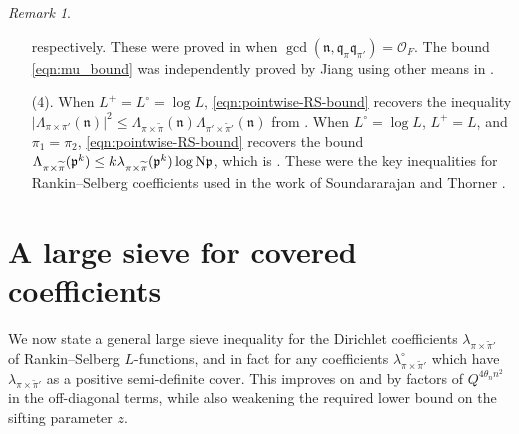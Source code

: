\documentclass[11pt]{amsart}
\theoremstyle{remark}
\newtheorem*{remark}{Remark}
\numberwithin{equation}{section}
\newcommand{\kp}{\mathfrak{p}}
\newcommand{\kn}{\mathfrak{n}}
\newcommand{\kq}{\mathfrak{q}}
\newcommand{\N}{\textnormal{N}}
\renewcommand{\tilde}{\widetilde}
\begin{document}
\begin{remark}
\begin{itemize}
\begin{equation}
\end{equation}
respectively.  These were proved in \cite[Section 4]{humphries2024zeros} when $\gcd(\kn,\kq_{\pi}\kq_{\pi'})=\mathcal{O}_F$.  The bound \eqref{eqn:mu_bound} was independently proved by Jiang using other means in \cite[Lemma~3.1]{Jiang}.
\item[(4).] When $L^+ = L^\circ = \log L$, \eqref{eqn:pointwise-RS-bound} recovers the inequality $|\Lambda_{\pi\times\pi'}(\kn)|^2\leq \Lambda_{\pi\times\tilde{\pi}}(\kn)\Lambda_{\pi'\times\tilde{\pi}'}(\kn)$ from \cite[Proposition A.1]{soundararajan2019weak}. When $L^\circ = \log L$, $L^+ = L$, and $\pi_1 = \pi_2$, \eqref{eqn:pointwise-RS-bound} recovers the bound $\Lambda_{\pi\times\tilde{\pi}}(\kp^k)\leq k\lambda_{\pi\times\tilde{\pi}}(\kp^k) \log \N\kp$, which is \cite[(6.10)]{soundararajan2019weak}. These were the key inequalities for Rankin--Selberg coefficients used in the work of Soundararajan and Thorner \cite{soundararajan2019weak}.
\end{itemize}
\end{remark}


\section{A large sieve for covered coefficients} \label{sec:large-sieve}

We now state a general large sieve inequality for the Dirichlet coefficients $\lambda_{\pi \times \tilde\pi'}$ of Rankin--Selberg $L$-functions, and in fact for any coefficients $\lambda^\circ_{\pi \times \tilde\pi'}$ which have $\lambda_{\pi \times \tilde\pi'}$ as a positive semi-definite cover. This improves on \cite[Theorem 4.2]{TZ_GLn} and \cite[Theorem 4.1]{humphries2024zeros} by factors of $Q^{4\theta_n n^2}$ in the off-diagonal terms, while also weakening the required lower bound on the sifting parameter $z$.
\end{document}
